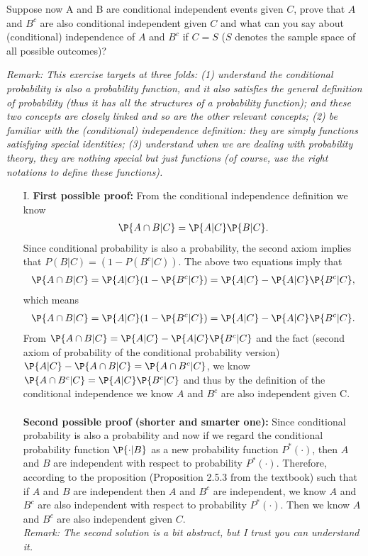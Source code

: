 \begin{exercise}
	Suppose now A and B are conditional independent events given $C$, prove that $A$ and $B^c$ are also conditional independent given $C$ and what can you say about (conditional) independence of $A$ and $B^c$ if $C=S$ ($S$ denotes the sample space of all possible outcomes)? 
	\begin{solution}
		\textit{\scriptsize Remark: 			This exercise targets at three folds: (1) understand the conditional probability is also a probability function, and it also satisfies the general definition of probability (thus it has all the structures of a probability function); and these two concepts are closely linked and so are the other relevant concepts; (2) be familiar with the (conditional) independence definition: they are simply functions satisfying special identities; (3) understand when we are dealing with probability theory, they are nothing special but just functions (of course, use the right notations to define these functions).} \\
		\begin{itemize}
			\item[I.] 		\textbf{First possible proof:}
			From the conditional independence definition we know
			\begin{align*}
				\P{A\cap B|C} = 	\P{A|C} \P{B|C}. 
			\end{align*}
			Since conditional probability is also a probability, the second axiom implies that $P(B|C)=(1-P(B^c|C))$. The above two equations imply that 
			\begin{align*}
				\P{A\cap B|C} = 	\P{A|C}(1-\P{B^c|C}) =\P{A|C}-\P{A|C}\P{B^c|C}, 
			\end{align*}
			which means 
			\begin{align*}
				\P{A\cap B|C} = 	\P{A|C}(1-\P{B^c|C}) =\P{A|C}-\P{A|C}\P{B^c|C}. 
			\end{align*}
			From $				\P{A\cap B|C} = \P{A|C}-\P{A|C}\P{B^c|C}$ and the fact (second axiom of probability of the conditional probability version) $\P{A|C}-\P{A\cap B|C}=\P{A\cap B^c|C}$, we know
			$\P{A\cap B^c|C} = \P{A|C} \P{B^c|C}$ and thus by the definition of the conditional independence we know $A$ and $B^c$ are also independent given C. \\~\\
			\textbf{Second possible proof (shorter and smarter one):} 				Since conditional probability is also a probability and now if we regard the conditional probability function $\P{\cdot|B}$ as a new probability function $P^*(\cdot)$, then $A$ and $B$ are independent with respect to probability $P^*(\cdot)$. Therefore,  according to the proposition (Proposition 2.5.3 from the textbook) such that if $A$ and $B$ are independent then   $A$ and $B^c$ are independent, we know  $A$ and $B^c$ are also independent with respect to probability $P^*(\cdot)$.  Then we know $A$ and $B^c$ are also independent given $C$.\\ \textit{\scriptsize Remark: The second solution is a bit abstract, but I trust you can understand it.}\\

\end{itemize}
\end{solution}
\end{exercise}
